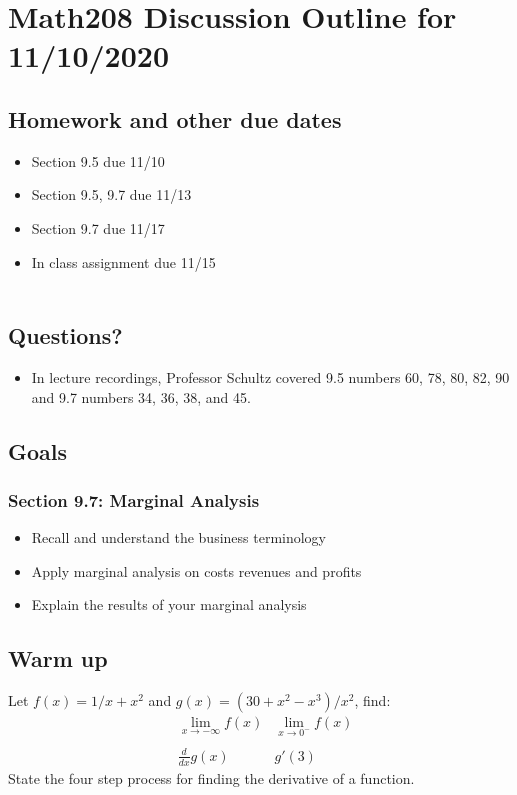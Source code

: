\documentclass[14pt]{extarticle}
\begin{document}
\section*{Math208 Discussion Outline for 11/10/2020}

\subsection{Homework and other due dates}
\begin{itemize}
\item Section 9.5 due 11/10
\item Section 9.5, 9.7 due 11/13
\item Section 9.7 due 11/17
\item In class assignment due 11/15 \\\\
\end{itemize}

\subsection{Questions?}
\begin{itemize}
	\item In lecture recordings, Professor Schultz covered 9.5 numbers 60, 78, 80, 82, 90 and 9.7 numbers 34, 36, 38, and 45.
\end{itemize}

\subsection{Goals}
\subsubsection*{Section 9.7: Marginal Analysis}
\begin{itemize}
	\item Recall and understand the business terminology
	\item Apply marginal analysis on costs revenues and profits
	\item Explain the results of your marginal analysis
\end{itemize}

\subsection{Warm up} Let $f(x) = 1/x  + x^2$ and $g(x)= (30 + x^2 - x^3)/x^2$, find:
\begin{align*}
	&\lim_{x \to -\infty}f(x)	&\lim_{x \to 0^-}f(x) \\\\
	&\frac{d}{dx}g(x)			&g'(3) 
\end{align*}
State the four step process for finding the derivative of a function.
\end{document}
